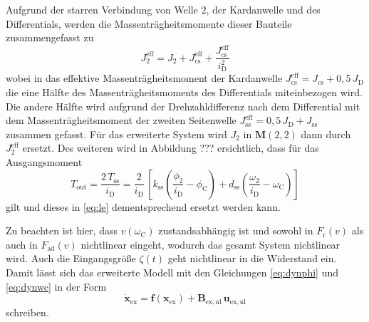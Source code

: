 Aufgrund der starren Verbindung von Welle 2, der Kardanwelle und des Differentials, werden die Massenträgheitsmomente dieser Bauteile zusammengefasst zu
\begin{equation}
J^\mathrm{eff}_2 = J_2 + J^\mathrm{eff}_\mathrm{cs} + \frac{J^\mathrm{eff}_\mathrm{cs}}{i_\mathrm{D}^2}
\end{equation}
wobei in das effektive Massenträgheitsmoment der Kardanwelle $J^\mathrm{eff}_\mathrm{cs} = J_\mathrm{cs} + 0,5\,J_\mathrm{D}$ die eine Hälfte des Massenträgheitsmoments des Differentials miteinbezogen wird. Die andere Hälfte wird aufgrund der Drehzahldifferenz nach dem Differential mit dem Massenträgheitsmoment der zweiten Seitenwelle $J^\mathrm{eff}_\mathrm{ss} =  0,5\,J_\mathrm{D} + J_\mathrm{ss}$ zusammen gefasst. Für das erweiterte System wird $J_2$ in $\pmb{M}(2,2)$ dann durch $J^\mathrm{eff}_2$ ersetzt. Des weiteren wird in Abbildung ??? ersichtlich, dass für das Ausgangsmoment 
\begin{equation}
T_\mathrm{out} = \frac{2\,T_\mathrm{ss}}{i_\mathrm{D}} = \frac{2}{i_\mathrm{D}}\,\left[ k_\mathrm{ss}\left(\frac{\phi_2}{i_{\mathrm{D}}} - \phi_\mathrm{C}\right) + d_\mathrm{ss}\left(\frac{\omega_2}{i_{\mathrm{D}}} - \omega_\mathrm{C}\right)\right]
\end{equation}
gilt und dieses in \eqref{eq:le} dementsprechend ersetzt werden kann.

Zu beachten ist hier, dass $v(\omega_\mathrm{C})$ zustandsabhängig ist und sowohl in $F_\mathrm{r}(v)$ als auch in $F_\mathrm{ad}(v)$ nichtlinear eingeht, wodurch das gesamt System nichtlinear wird. Auch die Eingangsgröße $\zeta(t)$ geht nichtlinear in die Widerstand ein. Damit lässt sich das erweiterte Modell mit 
den Gleichungen \eqref{eq:dynphi} und \eqref{eq:dynwc} in der Form 
\begin{equation}\label{eq:sys_nl}
\dot{\pmb{x}}_\mathrm{ex} = \pmb{f}(\pmb{x}_\mathrm{ex}) + \pmb{B}_\mathrm{ex,nl}\,\pmb{u}_\mathrm{ex,nl}
\end{equation}
schreiben.

